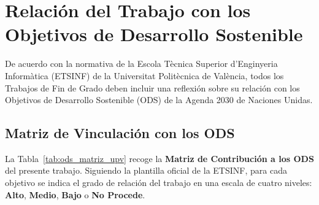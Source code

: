 \chapter[Relación con los ODS]{Relación del Trabajo con los Objetivos de Desarrollo Sostenible}
\label{anx:ods}

De acuerdo con la normativa de la Escola Tècnica Superior d'Enginyeria Informàtica (ETSINF) de la Universitat Politècnica de València, todos los Trabajos de Fin de Grado deben incluir una reflexión sobre su relación con los Objetivos de Desarrollo Sostenible (ODS) de la Agenda 2030 de Naciones Unidas.

\section*{Matriz de Vinculación con los ODS}

La Tabla~\ref{tab:ods_matriz_upv} recoge la \textbf{Matriz de Contribución a los ODS} del presente trabajo. Siguiendo la plantilla oficial de la ETSINF, para cada objetivo se indica el grado de relación del trabajo en una escala de cuatro niveles: \textbf{Alto}, \textbf{Medio}, \textbf{Bajo} o \textbf{No Procede}.


